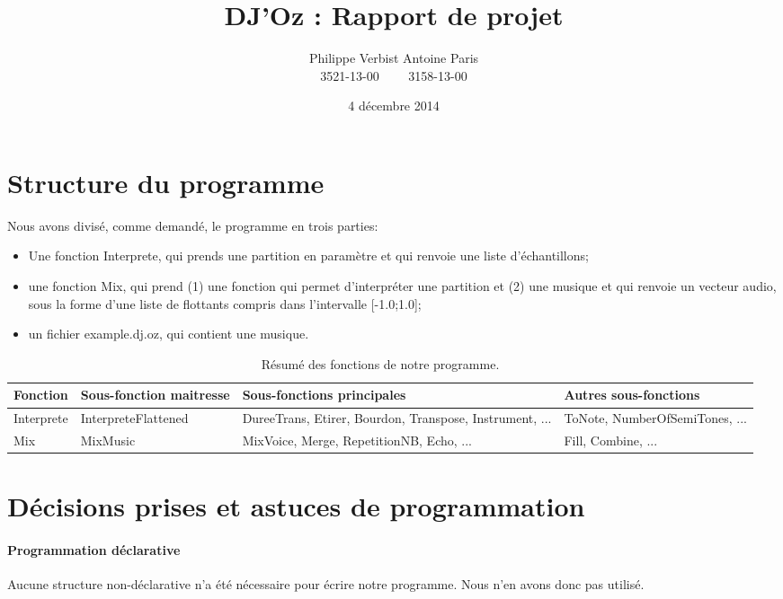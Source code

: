 \documentclass[12pt,a4paper]{article}
\author{Philippe Verbist  Antoine Paris\\3521-13-00 \ \ \ \ 3158-13-00}
\title{DJ'Oz : Rapport de projet}
\date{4 décembre 2014}
\begin{document}
\maketitle


\section{Structure du programme}
Nous avons divisé, comme demandé, le programme en trois parties:
\begin{itemize}
	\item Une fonction Interprete, qui prends une partition en 	paramètre et qui renvoie une liste d'échantillons;
	\item une fonction Mix, qui prend (1) une fonction qui permet d'interpréter une partition  et (2) une musique et qui renvoie un vecteur audio, sous la forme d'une liste de flottants compris dans l'intervalle [-1.0;1.0];
	\item un fichier example.dj.oz, qui contient une musique.
\end{itemize}



	\begin{table}[ht!]
		\centering
			\begin{tabular}{|p{}|p{}|p{0.25\textwidth}|p{}|}
			\hline
			\textbf{Fonction}		& \textbf{Sous-fonction maitresse}& \textbf{Sous-fonctions principales} & \textbf{Autres sous-fonctions}	\\
			\hline
Interprete		&InterpreteFlattened	& DureeTrans, Etirer, Bourdon, Transpose, Instrument, ... & ToNote, NumberOfSemiTones, ...\\
			\hline
Mix 	& MixMusic &  MixVoice, Merge, RepetitionNB, Echo, ... &  Fill, Combine, ...\\
			\hline 


			\hline
			\end{tabular}
		\caption{Résumé des fonctions de notre programme.}
	\end{table}


\section{Décisions prises et astuces de programmation}
\paragraph{Programmation déclarative} Aucune structure non-déclarative n'a été nécessaire pour écrire notre programme. Nous n'en avons donc pas utilisé.
\end{document}

